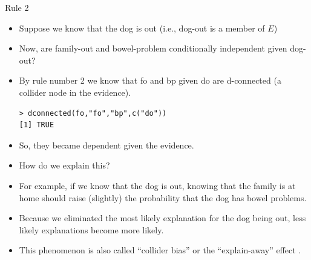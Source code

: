 \documentclass[handout]{beamer}
\begin{document}
\begin{frame}[fragile]{Rule 2}
\scriptsize{
\begin{itemize}

\item Suppose we know that the dog is out (i.e., dog-out is a member of $E$)

\item Now, are family-out and bowel-problem conditionally independent given dog-out?

\item By rule number 2 we know that fo and bp given do are d-connected (a collider node in the evidence).

\begin{verbatim}
> dconnected(fo,"fo","bp",c("do"))
[1] TRUE 
\end{verbatim}

\item So, they became dependent given the evidence.

\item How do we explain this?

\item For example, if we know that the dog is out, knowing that the family is at home should raise (slightly) the probability that the dog has bowel problems.

\item Because we eliminated the most likely explanation for the dog being out, less likely explanations become more likely.

\item This phenomenon is also called ``collider bias'' or the ``explain-away'' effect \cite{pearl2018book}.

\end{itemize}

} 

\end{frame}
\end{document}
